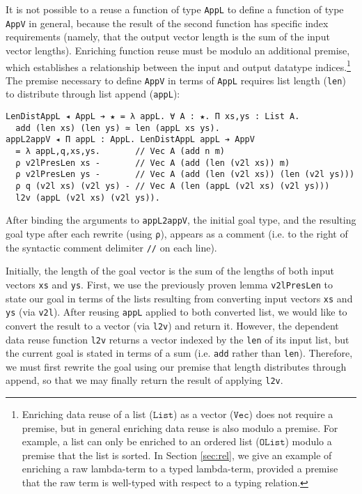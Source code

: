 \documentclass[acmsmall]{acmart}\settopmatter{}
\newcommand{\refsec}[1]{Section \ref{sec:#1}}
\newcommand{\txt}[1]{\ensuremath{\texttt{#1}}}
\begin{document}
It is not possible to a reuse a function of type \verb;AppL; to define
a function of type \verb;AppV; in general, because the result of the second function
has specific index requirements (namely, that the output vector
length is the sum of the input vector lengths). Enriching
function reuse must be modulo an additional premise, which establishes
a relationship between the input and output datatype
indices.\footnote{
  Enriching data reuse of a list (\txt{List}) as a vector (\txt{Vec})
  does not require a premise, but in general enriching data reuse is
  also modulo a premise. For example, a list can only be enriched to
  an ordered list (\txt{OList}) modulo a premise that the list is
  sorted. In \refsec{rel}, we give an example of enriching a raw
  lambda-term to a typed lambda-term, provided a premise that the raw
  term is well-typed with respect to a typing relation.
  }
The premise necessary to define \verb;AppV; in terms of \verb;AppL; requires
list length (\verb;len;) to distribute through list append (\verb;appL;):
\begin{verbatim}
LenDistAppL ◂ AppL ➔ ★ = λ appL. ∀ A : ★. Π xs,ys : List A.
  add (len xs) (len ys) ≃ len (appL xs ys).
appL2appV ◂ Π appL : AppL. LenDistAppL appL ➔ AppV
  = λ appL,q,xs,ys.       // Vec A (add n m)            
  ρ v2lPresLen xs -       // Vec A (add (len (v2l xs)) m)
  ρ v2lPresLen ys -       // Vec A (add (len (v2l xs)) (len (v2l ys)))
  ρ q (v2l xs) (v2l ys) - // Vec A (len (appL (v2l xs) (v2l ys)))
  l2v (appL (v2l xs) (v2l ys)).
\end{verbatim}
After binding the arguments to \verb;appL2appV;,
the initial goal type, and the resulting goal type after each
rewrite (using \verb;ρ;), appears as a comment
(i.e. to the right of the syntactic comment delimiter \verb;//; on each line).

Initially, the length of the goal vector is the sum of the lengths of
both input vectors \verb;xs; and \verb;ys;. First, we use the
previously proven lemma \verb;v2lPresLen; to state our goal in terms
of the lists resulting from converting input vectors \verb;xs; and
\verb;ys; (via \verb;v2l;). After reusing \verb;appL; applied to both
converted list, we would like to convert the result to a vector (via
\verb;l2v;) and return it. However, the dependent data reuse function
\verb;l2v; returns a vector indexed by the \verb;len; of its input
list, but the current goal is stated in terms of a sum
(i.e. \verb;add; rather than \verb;len;). Therefore, we must first
rewrite the goal using our premise that length distributes through
append, so that we may finally return the result of applying
\verb;l2v;.
\end{document}
